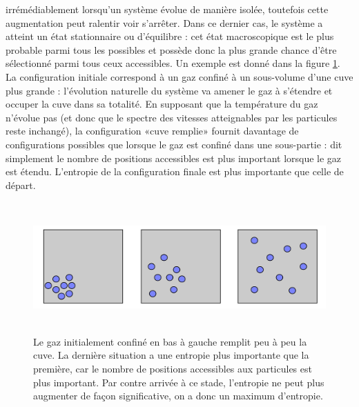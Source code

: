  irrémédiablement lorsqu'un système évolue de manière isolée, toutefois cette augmentation peut ralentir voir s'arrêter. Dans ce dernier cas, le système a atteint un état stationnaire ou d'équilibre : cet état macroscopique est le plus probable parmi tous les possibles et possède donc la plus grande chance d'être sélectionné parmi tous ceux accessibles. Un exemple est donné dans la figure \ref{f:equi}. La configuration initiale correspond à un gaz confiné à un sous-volume d'une cuve plus grande : l'évolution naturelle du système va amener le gaz à s'étendre et occuper la cuve dans sa totalité. En supposant que la température du gaz n'évolue pas (et donc que le spectre des vitesses atteignables par les particules reste inchangé), la configuration «cuve remplie» fournit davantage de configurations possibles que lorsque le gaz est confiné dans une sous-partie : dit simplement le nombre de positions accessibles est plus important lorsque le gaz est étendu. L'entropie de la configuration finale est plus importante que celle de départ. 
\begin{figure}[htbp]
	\centering
		\includegraphics[height=5cm]{figs/equiconfig.png}
\caption[Remplissage d'une cuve par un gaz]{Le gaz initialement confiné en bas à gauche remplit peu à peu la cuve. La dernière situation a une entropie plus importante que la première, car le nombre de positions accessibles aux particules est plus important. Par contre arrivée à ce stade, l'entropie ne peut plus augmenter de façon significative, on a donc un maximum d'entropie.}
	\label{f:equi}
\end{figure}

